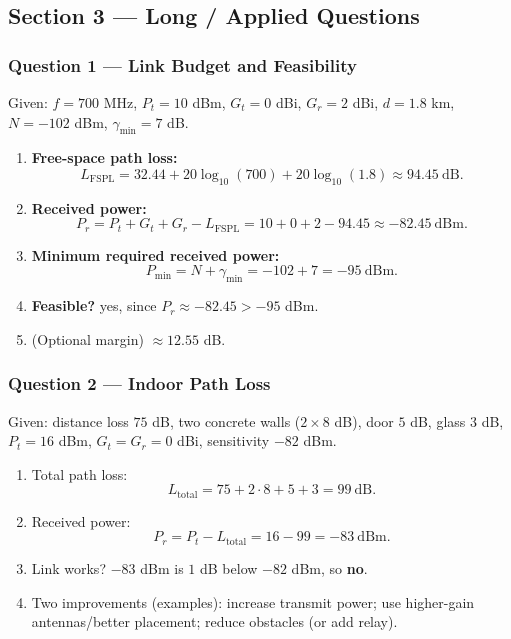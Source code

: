 \documentclass[11pt,a4paper]{article}
\begin{document}
\subsection*{Section 3 --- Long / Applied Questions}

\subsubsection*{Question 1 --- Link Budget and Feasibility}
Given: $f=700$ MHz, $P_t=10$ dBm, $G_t=0$ dBi, $G_r=2$ dBi, $d=1.8$ km, $N=-102$ dBm, $\gamma_{\min}=7$ dB.

\begin{enumerate}[label=\alph*.]
    \item \textbf{Free-space path loss:}
    \[
    L_{\mathrm{FSPL}}=32.44+20\log_{10}(700)+20\log_{10}(1.8)\approx 94.45\ \mathrm{dB}.
    \]
    \item \textbf{Received power:}
    \[
    P_r=P_t+G_t+G_r-L_{\mathrm{FSPL}}=10+0+2-94.45\approx -82.45\ \mathrm{dBm}.
    \]
    \item \textbf{Minimum required received power:}
    \[
    P_{\min}=N+\gamma_{\min}=-102+7=-95\ \mathrm{dBm}.
    \]
    \item \textbf{Feasible?} yes, since $P_r\approx -82.45 > -95$ dBm.
    \item (Optional margin) $\approx 12.55$ dB.
    
\end{enumerate}

\subsubsection*{Question 2 --- Indoor Path Loss}
Given: distance loss $75$ dB, two concrete walls ($2\times 8$ dB), door $5$ dB, glass $3$ dB, $P_t=16$ dBm, $G_t=G_r=0$ dBi, sensitivity $-82$ dBm.

\begin{enumerate}[label=\alph*.]
    \item Total path loss:
    \[
    L_{\text{total}}=75+2\cdot 8+5+3=99\ \mathrm{dB}.
    \]
    \item Received power:
    \[
    P_r=P_t-L_{\text{total}}=16-99=-83\ \mathrm{dBm}.
    \]
    \item Link works? $-83$ dBm is $1$ dB below $-82$ dBm, so \textbf{no}.
    \item Two improvements (examples): increase transmit power; use higher-gain antennas/better placement; reduce obstacles (or add relay).
\end{enumerate}
\end{document}
